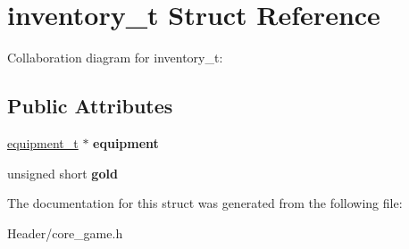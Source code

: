 \hypertarget{structinventory__t}{}\section{inventory\+\_\+t Struct Reference}
\label{structinventory__t}


Collaboration diagram for inventory\+\_\+t\+:
\subsection*{Public Attributes}
\begin{DoxyCompactItemize}
\item 
\mbox{\label{structinventory__t_a0ced033e933519e4cc57c408ec68e709}} 
\hyperlink{structequipment__t}{equipment\+\_\+t} $\ast$ {\bfseries equipment}
\item 
\mbox{\label{structinventory__t_ade17416b577cd1c732f161187a725782}} 
unsigned short {\bfseries gold}
\end{DoxyCompactItemize}


The documentation for this struct was generated from the following file\+:\begin{DoxyCompactItemize}
\item 
Header/core\+\_\+game.\+h\end{DoxyCompactItemize}
